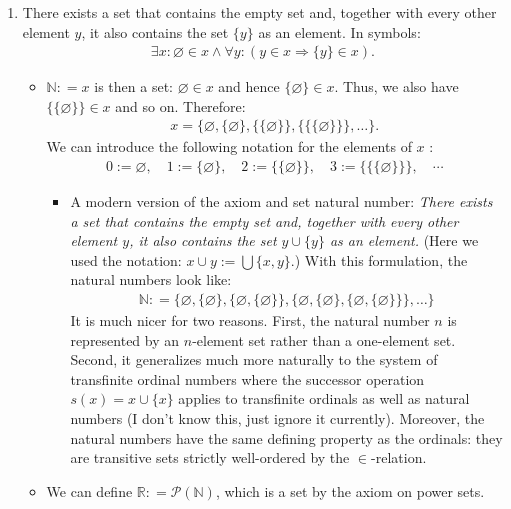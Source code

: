 \documentclass{article}
\begin{document}
\begin{enumerate}
\begin{itemize}
\end{itemize}
\item {} There exists a set that contains the empty set and, together with every other element $y$, it also contains the set $\{y\}$ as an element. In symbols:
\begin{align*}
\exists x: \varnothing \in x \wedge \forall y:(y \in x \Rightarrow\{y\} \in x) .
\end{align*}
\begin{itemize}
    \item  $\mathbb{N:}=x$ is then a set:  $\varnothing \in x$ and hence $\{\varnothing\} \in x$. Thus, we also have $\{\{\varnothing\}\} \in x$ and so on. Therefore:
\begin{align*}
x=\{\varnothing,\{\varnothing\},\{\{\varnothing\}\},\{\{\{\varnothing\}\}\}, \ldots\} .
\end{align*}
We can introduce the following notation for the elements of $x$ :
\begin{align*}
0:=\varnothing, \quad 1:=\{\varnothing\}, \quad 2:=\{\{\varnothing\}\}, \quad 3:=\{\{\{\varnothing\}\}\}, \quad \cdots
\end{align*}
\begin{itemize}[$\ast$]
    \item A modern version of the axiom and set natural number:  \emph{There exists a set that contains the empty set and, together with every other element $y$, it also contains the set $y \cup\{y\}$ as an element.} (Here we used the notation: $x \cup y:=\bigcup\{x, y\}$.)
With this formulation, the natural numbers look like:
\begin{align*}
\mathbb{N:}=\{\varnothing,\{\varnothing\},\{\varnothing,\{\varnothing\}\},\{\varnothing,\{\varnothing\},\{\varnothing,\{\varnothing\}\}\}, \ldots\}
\end{align*}
It is much nicer for two reasons. First, the natural number $n$ is represented by an $n$-element set rather than a one-element set. Second, it generalizes much more naturally to the system of transfinite ordinal numbers where the successor operation $s(x)=x \cup\{x\}$ applies to transfinite ordinals as well as natural numbers (I don't know this, just ignore it currently). Moreover, the natural numbers have the same defining property as the ordinals: they are transitive sets strictly well-ordered by the $\in$-relation.
\end{itemize}
\item We can define $\mathbb{R:}=\mathcal{P}(\mathbb{N})$, which is a set by the axiom on power sets.
\end{itemize}


\end{enumerate}
\end{document}
